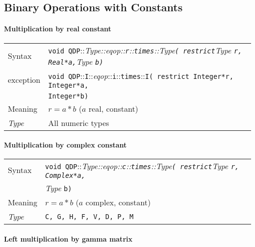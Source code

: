 \documentclass[12pt,letterpaper]{article}
\newcommand{\tReal}{Real}
\newcommand{\tComplex}{Complex}
\newcommand{\tInt}{Integer}
\newcommand{\namespace}{QDP}
\newcommand{\allNumericTypes}{All numeric types}
\newcommand{\ttdash}{{::}}
\newcommand{\itt}{\it Type}
\newcommand{\extraarg}{}
\begin{document}
\subsection{Binary Operations with Constants}

\paragraph{Multiplication by real constant}

\begin{flushleft}
  \begin{tabular}{|l|l|}
  \hline
  Syntax      & {{\tt void \namespace}\ttdash\itt\ttdash{\it eqop}\ttdash{\tt r}\ttdash{\tt times}\ttdash\itt{\tt ( restrict}{\it Type }{\tt *r, \tReal *a,}{\it Type }{\tt *b\extraarg)}} \\
  exception    & {\tt void \namespace}\ttdash{\tt I}\ttdash{\it eqop}\ttdash{\tt i}\ttdash{\tt times}\ttdash{\tt I( restrict \tInt *r, \tInt *a,}\\
              & {\tt \tInt *b\extraarg)} \\
  \hline
  Meaning     & $r = a*b$ ($a$ real, constant)
$
$\\
  \hline
  \itt     & \allNumericTypes \\
  \hline
  \end{tabular}
\end{flushleft}

\paragraph{Multiplication by complex constant}

\begin{flushleft}
  \begin{tabular}{|l|l|}
  \hline
  Syntax      & {\tt void \namespace}\ttdash\itt\ttdash{\it eqop}\ttdash{\tt c}\ttdash{\tt times}\ttdash\itt{\tt ( restrict}{\it Type }{\tt *r, \tComplex *a,}\\
              & {\it Type }{\tt *b\extraarg)} \\
  \hline
  Meaning     & $r = a*b$ ($a$ complex, constant)
$
$\\
  \hline
  \itt     & {\tt C, G, H, F, V, D, P, M} \\
  \hline
  \end{tabular}
\end{flushleft}

\paragraph{Left multiplication by gamma matrix}
\end{document}
